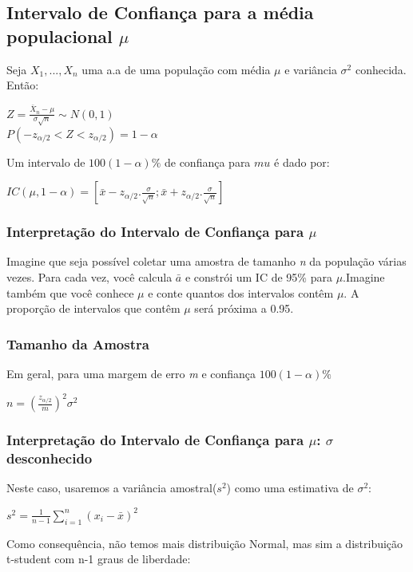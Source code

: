\documentclass[a4paper, 12pt]{article}
\begin{document}
\subsection{Intervalo de Confiança para a média populacional $\mu$}
	Seja $X_1, ..., X_n$ uma a.a de uma população com média $\mu$ e variância $ \sigma ^2 $ conhecida. Então:
	\begin{center}
		\Large
		$ 
		Z = \frac{\bar{X}_n - \mu}{\sigma \sqrt{n}}\sim N(0,1)
		$\\
		$ 
		P(-z_{\alpha /2} < Z < z_{\alpha /2}) = 1 - \alpha
		$
	\end{center}
	Um intervalo de $ 100(1-\alpha)\% $ de confiança para $ mu $ é dado por:
	\begin{center}
		\Large
		$ 
		IC(\mu, 1-\alpha) = [\bar{x} - z_{\alpha /2}.\frac{\sigma}{\sqrt{n}}; \bar{x}+z_{\alpha /2}.\frac{\sigma}{\sqrt{n}}]
		$
	\end{center}

\subsubsection{Interpretação do Intervalo de Confiança para $ \mu $}
Imagine que seja possível coletar uma amostra de tamanho \textit{n} da população várias vezes. Para cada vez, você calcula $\bar{a}$ e constrói um IC de 95\% para $\mu$.Imagine também que você conhece $\mu$ e conte quantos dos intervalos contêm $\mu$. A proporção de intervalos que contêm $\mu$ será próxima a 0.95.

\subsubsection{Tamanho da Amostra}
	Em geral, para uma margem de erro \textit{m} e confiança $ 100(1-\alpha) \%$
	\begin{center}
		\Large
		$ 
		n = (\frac{z_{\alpha /2}}{m})^2\sigma ^2
		$
	\end{center}

\subsubsection{Interpretação do Intervalo de Confiança para $ \mu $: $ \sigma$ desconhecido }
	Neste caso, usaremos a variância amostral($ s^2 $) como uma estimativa de $ \sigma ^2 $:
	\begin{center}
		\Large
		$ 
		s^2 = \frac{1}{n - 1} \sum_{i = 1}^{n}(x_i-\bar{x})^2
		$
	\end{center}
	Como consequência, não temos mais distribuição Normal, mas sim a distribuição t-student com n-1 graus de liberdade:
	
\end{document}
